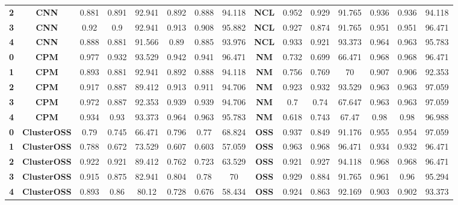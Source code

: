 {{\begin{tabular}{c|c|cccccc|ccccccc}
\textbf{2} & \textbf{CNN} & 0.881 & 0.891 & 92.941 & 0.892 & 0.888 & 94.118 & \multicolumn{1}{c|}{\textbf{NCL}} & 0.952 & 0.929 & 91.765 & 0.936 & 0.936 & 94.118 \\
\textbf{3} & \textbf{CNN} & 0.92  & 0.9   & 92.941 & 0.913 & 0.908 & 95.882 & \multicolumn{1}{c|}{\textbf{NCL}} & 0.927 & 0.874 & 91.765 & 0.951 & 0.951 & 96.471 \\
\textbf{4} & \textbf{CNN} & 0.888 & 0.881 & 91.566 & 0.89  & 0.885 & 93.976 & \multicolumn{1}{c|}{\textbf{NCL}} & 0.933 & 0.921 & 93.373 & 0.964 & 0.963 & 95.783 \\
\textbf{0} & \textbf{CPM} & 0.977 & 0.932 & 93.529 & 0.942 & 0.941 & 96.471 & \multicolumn{1}{c|}{\textbf{NM}} & 0.732 & 0.699 & 66.471 & 0.968 & 0.968 & 96.471 \\
\textbf{1} & \textbf{CPM} & 0.893 & 0.881 & 92.941 & 0.892 & 0.888 & 94.118 & \multicolumn{1}{c|}{\textbf{NM}} & 0.756 & 0.769 & 70    & 0.907 & 0.906 & 92.353 \\
\textbf{2} & \textbf{CPM} & 0.917 & 0.887 & 89.412 & 0.913 & 0.911 & 94.706 & \multicolumn{1}{c|}{\textbf{NM}} & 0.923 & 0.932 & 93.529 & 0.963 & 0.963 & 97.059 \\
\textbf{3} & \textbf{CPM} & 0.972 & 0.887 & 92.353 & 0.939 & 0.939 & 94.706 & \multicolumn{1}{c|}{\textbf{NM}} & 0.7   & 0.74  & 67.647 & 0.963 & 0.963 & 97.059 \\
\textbf{4} & \textbf{CPM} & 0.934 & 0.93  & 93.373 & 0.964 & 0.963 & 95.783 & \multicolumn{1}{c|}{\textbf{NM}} & 0.618 & 0.743 & 67.47 & 0.98  & 0.98  & 96.988 \\
\textbf{0} & \textbf{ClusterOSS} & 0.79  & 0.745 & 66.471 & 0.796 & 0.77  & 68.824 & \multicolumn{1}{c|}{\textbf{OSS}} & 0.937 & 0.849 & 91.176 & 0.955 & 0.954 & 97.059 \\
\textbf{1} & \textbf{ClusterOSS} & 0.788 & 0.672 & 73.529 & 0.607 & 0.603 & 57.059 & \multicolumn{1}{c|}{\textbf{OSS}} & 0.963 & 0.968 & 96.471 & 0.934 & 0.932 & 96.471 \\
\textbf{2} & \textbf{ClusterOSS} & 0.922 & 0.921 & 89.412 & 0.762 & 0.723 & 63.529 & \multicolumn{1}{c|}{\textbf{OSS}} & 0.921 & 0.927 & 94.118 & 0.968 & 0.968 & 96.471 \\
\textbf{3} & \textbf{ClusterOSS} & 0.915 & 0.875 & 82.941 & 0.804 & 0.78  & 70    & \multicolumn{1}{c|}{\textbf{OSS}} & 0.929 & 0.884 & 91.765 & 0.961 & 0.96  & 95.294 \\
\textbf{4} & \textbf{ClusterOSS} & 0.893 & 0.86  & 80.12 & 0.728 & 0.676 & 58.434 & \multicolumn{1}{c|}{\textbf{OSS}} & 0.924 & 0.863 & 92.169 & 0.903 & 0.902 & 93.373 \\

\end{tabular}}}
